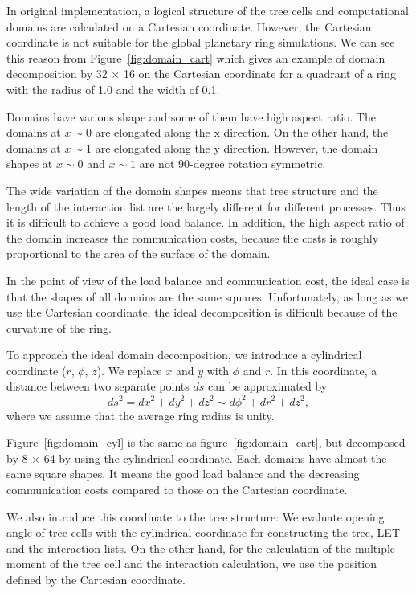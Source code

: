 \documentclass[]{pasj01}
\begin{document}
In original implementation, a logical structure of the tree cells and
computational domains are calculated on a Cartesian
coordinate. However, the Cartesian coordinate is not suitable for the
global planetary ring simulations. We can see this reason from
Figure~\ref{fig:domain_cart} which gives an example of domain
decomposition by 32 $\times$ 16 on the Cartesian coordinate for a
quadrant of a ring with the radius of 1.0 and the width of 0.1.

Domains have various shape and some of them have high aspect ratio.
The domains at $x \sim 0$ are elongated along the x direction. On the
other hand, the domains at $x \sim 1$ are elongated along the y
direction. However, the domain shapes at $x \sim 0$ and $x \sim 1$ are
not 90-degree rotation symmetric.

The wide variation of the domain shapes means that tree structure and
the length of the interaction list are the largely different for
different processes. Thus it is difficult to achieve a good load
balance. In addition, the high aspect ratio of the domain increases
the communication costs, because the costs is roughly proportional to
the area of the surface of the domain.

In the point of view of the load balance and communication cost, the
ideal case is that the shapes of all domains are the same
squares. Unfortunately, as long as we use the Cartesian coordinate,
the ideal decomposition is difficult because of the curvature of the
ring.

To approach the ideal domain decomposition, we introduce a cylindrical
coordinate ($r$, $\phi$, $z$). We replace $x$ and $y$ with $\phi$ and
$r$. In this coordinate, a distance between two separate points $ds$
can be approximated by
\begin{equation}
  \label{eq:metric}
  ds^2 = dx^2 + dy^2 + dz^2 \sim d\phi ^2 + dr^2 + dz^2,
\end{equation}
where we assume that the average ring radius is unity.

Figure~\ref{fig:domain_cyl} is the same as
figure~\ref{fig:domain_cart}, but decomposed by 8 $\times$ 64 by using
the cylindrical coordinate. Each domains have almost the same square
shapes. It means the good load balance and the decreasing
communication costs compared to those on the Cartesian coordinate.

We also introduce this coordinate to the tree structure: We evaluate
opening angle of tree cells with the cylindrical coordinate for
constructing the tree, LET and the interaction lists. On the other
hand, for the calculation of the multiple moment of the tree cell and
the interaction calculation, we use the position defined by the
Cartesian coordinate.
\end{document}
